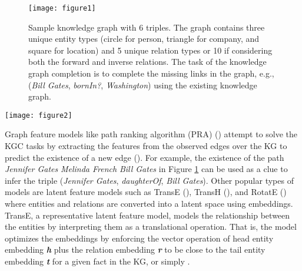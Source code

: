 \documentclass[11pt]{article}
\begin{document}
\begin{figure}[t]
\centering
\texttt{[image: figure1]}
\caption{Sample knowledge graph with 6 triples. The graph contains three unique entity types (circle for person, triangle for company, and square for location) and 5 unique relation types or 10 if considering both the forward and inverse relations. The task of the knowledge graph completion is to complete the missing links in the graph, e.g., (\emph{Bill Gates}, \emph{bornIn?}, \emph{Washington}) using the existing knowledge graph.}
\label{fig:sample_kg}
\end{figure}

\begin{figure*}[ht]
\centering
\texttt{[image: figure2]}
\caption{Proposed pre-training approach of the KGLM. First, both the forward and inverse triples are extracted from the knowledge graph to serve as the pre-training corpus. We then continue pre-training the language model, RoBERTa in our case, using the masked language model training objective, with an additional entity/relation-type embedding layer. The entity/relation-type embedding scheme shown here corresponds to the KGLM\textsubscript{GER}, the most fine-grained version where both the entity and relation types are considered unique. Note that the inverse relation denoted by \textsuperscript{-1} is different from its forward counterpart. For demonstration purposes, we assume all entities and relations to have a single token.}
\label{fig:overall}
\end{figure*}

Graph feature models like path ranking algorithm (PRA) (\citealp{lao2010relational, lao2011random}) attempt to solve the KGC tasks by extracting the features from the observed edges over the KG to predict the existence of a new edge (\citealp{nickel2015review}). For example, the existence of the path \emph{Jennifer Gates}  \emph{Melinda French}  \emph{Bill Gates} in Figure \ref{fig:sample_kg} can be used as a clue to infer the triple (\emph{Jennifer Gates}, \emph{daughterOf}, \emph{Bill Gates}). Other popular types of models are latent feature models such as TransE (\citealp{bordes2013translating}), TransH (\citealp{wang2014knowledge}), and RotatE (\citealp{sun2019rotate}) where entities and relations are converted into a latent space using embeddings. TransE, a representative latent feature model, models the relationship between the entities by interpreting them as a translational operation. That is, the model optimizes the embeddings by enforcing the vector operation of head entity embedding \emph{\textbf{h}} plus the relation embedding \emph{\textbf{r}} to be close to the tail entity embedding \emph{\textbf{t}} for a given fact in the KG, or simply .
\end{document}
